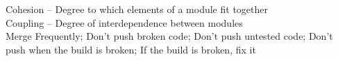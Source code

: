 \documentclass[number]{assignment}
\begin{document}
\begin{landscape}
\headfoot
\begin{multicols}{3}


Cohesion -- Degree to which elements of a module fit together\\
Coupling -- Degree of interdependence between modules\\

Merge Frequently; Don't push broken code; Don't push untested code; Don't push when the build is broken; If the build is broken, fix it\\


\end{multicols}
\end{landscape}
\end{document}
